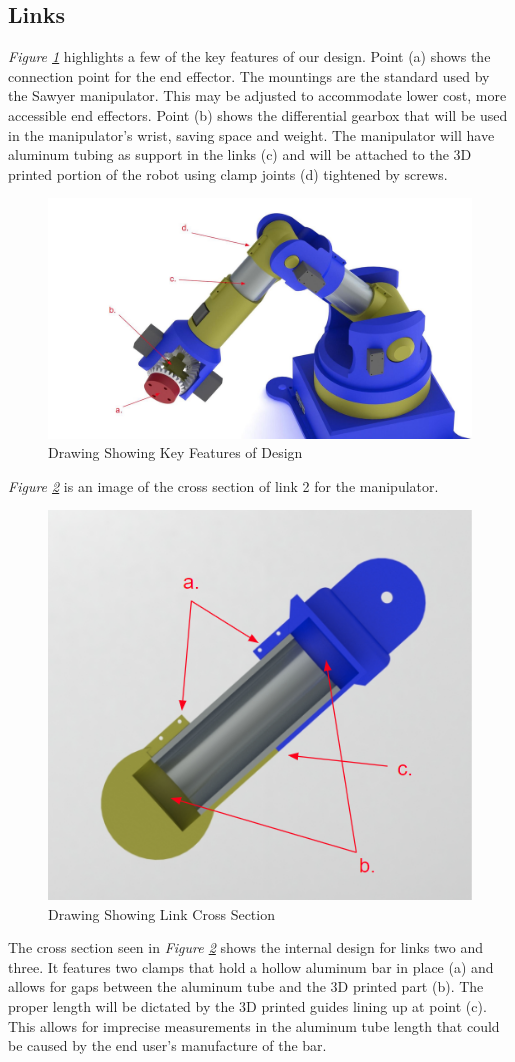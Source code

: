 \documentclass[12pt]{report}
\begin{document}
\subsection{Links}
\emph{Figure \ref{fig:link1}} highlights a few of the key features of our design. Point (a) shows the connection point for the end effector. The mountings are the standard used by the Sawyer manipulator. This may be adjusted to accommodate lower cost, more accessible end effectors. Point (b) shows the differential gearbox that will be used in the manipulator’s wrist, saving space and weight. The manipulator will have aluminum tubing as support in the links (c) and will be attached to the 3D printed portion of the robot using clamp joints (d) tightened by screws.

\begin{figure}[htp]
  \centering
  \includegraphics[frame,width=.75\textwidth]{link_callouts}
  \caption{Drawing Showing Key Features of Design}
  \label{fig:link1}
\end{figure}
\emph{Figure \ref{fig:link2}} is an image of the cross section of link 2 for the manipulator.
\begin{figure}[htp]
  \centering
  \includegraphics[frame,width=.45\textwidth]{link_cross_section}
  \caption{Drawing Showing Link Cross Section}
  \label{fig:link2}
\end{figure}
\newpage
The cross section seen in \emph{Figure \ref{fig:link2}} shows the internal design for links two and three. It features two clamps that hold a hollow aluminum bar in place (a) and allows for gaps between the aluminum tube and the 3D printed part (b). The proper length will be dictated by the 3D printed guides lining up at point (c). This allows for imprecise measurements in the aluminum tube length that could be caused by the end user’s manufacture of the bar.
\end{document}

